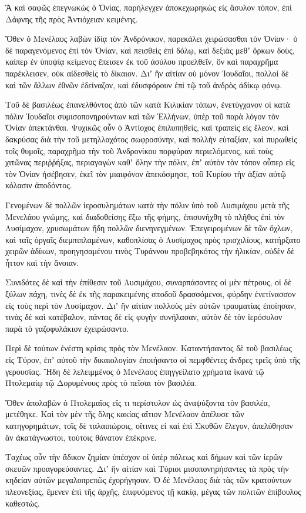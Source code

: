 {Ἃ καὶ σαφῶς ἐπεγνωκὼς ὁ Ὀνίας, παρήλεγχεν ἀποκεχωρηκὼς εἰς ἄσυλον τόπον, ἐπὶ Δάφνης τῆς πρὸς Ἀντιόχειαν κειμένης.
\par }{\PP {}Ὅθεν ὁ Μενέλαος λαβὼν ἰδίᾳ τὸν Ἀνδρόνικον, παρεκάλει χειρώσασθαι τὸν Ὀνίαν· ὁ δὲ παραγενόμενος ἐπὶ τὸν Ὀνίαν, καὶ πεισθεὶς ἐπὶ δόλῳ, καὶ δεξιὰς μεθʼ ὅρκων δοὺς, καίπερ ἐν ὑποψίᾳ κείμενος ἔπεισεν ἐκ τοῦ ἀσύλου προελθεῖν, ὃν καὶ παραχρῆμα παρέκλεισεν, οὐκ αἰδεσθεὶς τὸ δίκαιον.
Διʼ ἣν αἰτίαν οὐ μόνον Ἰουδαῖοι, πολλοὶ δὲ καὶ τῶν ἄλλων ἐθνῶν ἐδείναζον, καὶ ἐδυσφόρουν ἐπὶ τῷ τοῦ ἀνδρὸς ἀδίκῳ φόνῳ.
\par }{\PP {}Τοῦ δὲ βασιλέως ἐπανελθόντος ἀπὸ τῶν κατὰ Κιλικίαν τόπων, ἐνετύγχανον οἱ κατὰ πόλιν Ἰουδαῖοι συμισοπονηρούντων καὶ τῶν Ἑλλήνων, ὑπὲρ τοῦ παρὰ λόγον τὸν Ὀνίαν ἀπεκτάνθαι.
Ψυχικῶς οὖν ὁ Ἀντίοχος ἐπιλυπηθεὶς, καὶ τραπεὶς εἰς ἔλεον, καὶ δακρύσας διὰ τὴν τοῦ μετηλλαχότος σωφροσύνην, καὶ πολλὴν εὐταξίαν,
καὶ πυρωθεὶς τοῖς θυμοῖς, παραχρῆμα τὴν τοῦ Ἀνδρονίκου πορφύραν περιελόμενος, καὶ τοὺς χιτῶνας περιῤῥήξας, περιαγαγὼν καθʼ ὅλην τὴν πόλιν, ἐπʼ αὐτὸν τὸν τόπον οὗπερ εἰς τὸν Ὀνίαν ἠσέβησεν, ἐκεῖ τὸν μιαιφόνον ἀπεκόσμησε, τοῦ Κυρίου τὴν ἀξίαν αὐτῷ κόλασιν ἀποδόντος.
\par }{\PP {}Γενομένων δὲ πολλῶν ἱεροσυλημάτων κατὰ τὴν πόλιν ὑπὸ τοῦ Λυσιμάχου μετὰ τῆς Μενελάου γνώμης, καὶ διαδοθείσης ἔξω τῆς φήμης, ἐπισυνήχθη τὸ πλῆθος ἐπὶ τὸν Λυσίμαχον, χρυσωμάτων ἤδη πολλῶν διενηνεγμένων.
Ἐπεγειρομένων δὲ τῶν ὄχλων, καὶ ταῖς ὀργαῖς διεμπιπλαμένων, καθοπλίσας ὁ Λυσίμαχος πρὸς τρισχιλίους, κατήρξατο χειρῶν ἀδίκων, προηγησαμένου τινὸς Τυράννου προβεβηκότος τὴν ἡλικίαν, οὐδὲν δὲ ἧττον καὶ τὴν ἄνοιαν.
\par }{\PP {}Συνιδότες δὲ καὶ τὴν ἐπίθεσιν τοῦ Λυσιμάχου, συναρπάσαντες οἱ μὲν πέτρους, οἱ δὲ ξύλων πάχη, τινὲς δὲ ἐκ τῆς παρακειμένης σποδοῦ δρασσόμενοι, φύρδην ἐνετίνασσον εἰς τοὺς περὶ τὸν Λυσίμαχον.
Διʼ ἣν αἰτίαν πολλοὺς μὲν αὐτῶν τραυματίας ἐποίησαν, τινὰς δὲ καὶ κατέβαλον, πάντας δὲ εἰς φυγὴν συνήλασαν, αὐτὸν δὲ τὸν ἱερόσυλον παρὰ τὸ γαζοφυλάκιον ἐχειρώσαντο.
\par }{\PP {}Περὶ δὲ τούτων ἐνέστη κρίσις πρὸς τὸν Μενέλαον.
Καταντήσαντος δὲ τοῦ βασιλέως εἰς Τύρον, ἐπʼ αὐτοῦ τὴν δικαιολογίαν ἐποιήσαντο οἱ πεμφθέντες ἄνδρες τρεῖς ὑπὸ τῆς γερουσίας.
Ἤδη δὲ λελειμμένος ὁ Μενέλαος ἐπηγγείλατο χρήματα ἱκανὰ τῷ Πτολεμαίῳ τῷ Δορυμένους πρὸς τὸ πεῖσαι τὸν βασιλέα.
\par }{\PP {}Ὅθεν ἀπολαβὼν ὁ Πτολεμαῖος εἴς τι περίστυλον ὡς ἀναψύξοντα τὸν βασιλέα, μετέθηκε.
Καὶ τὸν μὲν τῆς ὅλης κακίας αἴτιον Μενέλαον ἀπέλυσε τῶν κατηγορημάτων, τοῖς δὲ ταλαιπώροις, οἵτινες εἰ καὶ ἐπὶ Σκυθῶν ἔλεγον, ἀπελύθησαν ἄν ἀκατάγνωστοι, τούτοις θάνατον ἐπέκρινε.
\par }{\PP {}Ταχέως οὖν τὴν ἄδικον ζημίαν ὑπέσχον οἱ ὑπὲρ πόλεως καὶ δήμων καὶ τῶν ἱερῶν σκευῶν προαγορεύσαντες.
Διʼ ἣν αἰτίαν καὶ Τύριοι μισοπονηρήσαντες τὰ πρὸς τὴν κηδείαν αὐτῶν μεγαλοπρεπῶς ἐχορήγησαν.
Ὁ δὲ Μενέλαος διὰ τὰς τῶν κρατούντων πλεονεξίας, ἔμενεν ἐπὶ τῆς ἀρχῆς, ἐπιφυόμενος τῇ κακίᾳ, μέγας τῶν πολιτῶν ἐπίβουλος καθεστώς.

}
